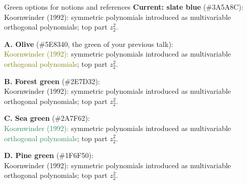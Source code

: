 \documentclass[10pt]{beamer}
\newcommand{\sample}[3]{\textbf{#1} (#2):\\ \textcolor{#3}{Koornwinder (1992):} symmetric polynomials introduced as multivariable \textcolor{#3}{orthogonal polynomials}; top part \textcolor{uibred}{$z_2^2$}.\par\medskip}
\begin{document}
\begin{frame}{Green options for notions and references}
\small
\sample{Current: slate blue}{\#3A5A8C}{slate}
\sample{A. Olive}{\#5E8340, the green of your previous talk}{olive}
\sample{B. Forest green}{\#2E7D32}{forest}
\sample{C. Sea green}{\#2A7F62}{seagreen}
\sample{D. Pine green}{\#1F6F50}{pine}
\end{frame}
\end{document}
